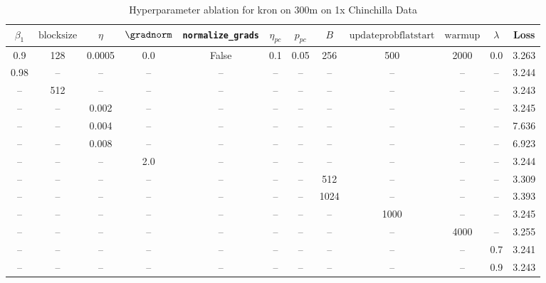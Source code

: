 \begin{table}[h!]
\centering
\caption{Hyperparameter ablation for kron on 300m on 1x Chinchilla Data}
\label{tab:ablation_kron_300m_on_1x_chinchilla_data}
\begin{tabular}{cccccccccccc}
\toprule
$\beta_1$ & $\mathrm{block size}$ & $\eta$ & $\gradnorm$ & \texttt{normalize\_grads} & $\eta_{pc}$ & $p_{pc}$ & $B$ & $\mathrm{update prob flat start}$ & $\mathrm{warmup}$ & $\lambda$ & Loss \\
\midrule
0.9 & 128 & 0.0005 & 0.0 & False & 0.1 & 0.05 & 256 & 500 & 2000 & 0.0 & 3.263 \\
\midrule
0.98 & -- & -- & -- & -- & -- & -- & -- & -- & -- & -- & 3.244 \\
-- & 512 & -- & -- & -- & -- & -- & -- & -- & -- & -- & 3.243 \\
-- & -- & 0.002 & -- & -- & -- & -- & -- & -- & -- & -- & 3.245 \\
-- & -- & 0.004 & -- & -- & -- & -- & -- & -- & -- & -- & 7.636 \\
-- & -- & 0.008 & -- & -- & -- & -- & -- & -- & -- & -- & 6.923 \\
-- & -- & -- & 2.0 & -- & -- & -- & -- & -- & -- & -- & 3.244 \\
-- & -- & -- & -- & -- & -- & -- & 512 & -- & -- & -- & 3.309 \\
-- & -- & -- & -- & -- & -- & -- & 1024 & -- & -- & -- & 3.393 \\
-- & -- & -- & -- & -- & -- & -- & -- & 1000 & -- & -- & 3.245 \\
-- & -- & -- & -- & -- & -- & -- & -- & -- & 4000 & -- & 3.255 \\
-- & -- & -- & -- & -- & -- & -- & -- & -- & -- & 0.7 & 3.241 \\
-- & -- & -- & -- & -- & -- & -- & -- & -- & -- & 0.9 & 3.243 \\
\bottomrule
\end{tabular}
\end{table}

